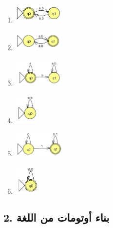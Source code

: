 \documentclass[12pt]{article}
\begin{document}
\begin{enumerate}
\item
\includegraphics[width=0.2\textwidth]{../../../images/DFAs/ex1_q5.png}\\

\item
\includegraphics[width=0.2\textwidth]{../../../images/DFAs/ex1_q6.png}\\

\item
\includegraphics[width=0.2\textwidth]{../../../images/DFAs/ex1_q7.png}\\

\item
\includegraphics[width=0.1\textwidth]{../../../images/DFAs/ex1_q8.png}\\

\item
\includegraphics[width=0.2\textwidth]{../../../images/DFAs/ex1_q9.png}\\

\item
\includegraphics[width=0.1\textwidth]{../../../images/DFAs/ex1_q10.png}
\end{enumerate}

\subsection*{2. بناء أوتومات من اللغة}
\end{document}
